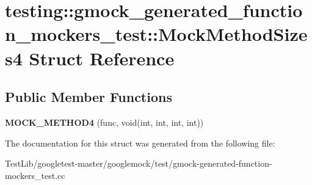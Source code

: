 \hypertarget{structtesting_1_1gmock__generated__function__mockers__test_1_1MockMethodSizes4}{}\section{testing\+:\+:gmock\+\_\+generated\+\_\+function\+\_\+mockers\+\_\+test\+:\+:Mock\+Method\+Sizes4 Struct Reference}
\label{structtesting_1_1gmock__generated__function__mockers__test_1_1MockMethodSizes4}
\subsection*{Public Member Functions}
\begin{DoxyCompactItemize}
\item 
\mbox{\label{structtesting_1_1gmock__generated__function__mockers__test_1_1MockMethodSizes4_a140f1bc5124d32b763913f5f64fe3502}} 
{\bfseries M\+O\+C\+K\+\_\+\+M\+E\+T\+H\+O\+D4} (func, void(int, int, int, int))
\end{DoxyCompactItemize}


The documentation for this struct was generated from the following file\+:\begin{DoxyCompactItemize}
\item 
Test\+Lib/googletest-\/master/googlemock/test/gmock-\/generated-\/function-\/mockers\+\_\+test.\+cc\end{DoxyCompactItemize}
